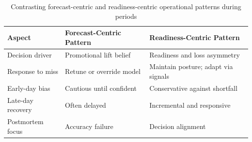
\begin{table}[htbp]
\centering
\caption{Contrasting forecast-centric and readiness-centric operational patterns during \LTO{} periods}
\label{tab:pattern-summary}
\begin{tabular}{@{}p{4cm}p{5cm}p{5cm}@{}}
\toprule
\textbf{Aspect} & \textbf{Forecast-Centric Pattern} & \textbf{Readiness-Centric Pattern} \\
\midrule
Decision driver & Promotional lift belief & Readiness and loss asymmetry \\
Response to miss & Retune or override model & Maintain posture; adapt via signals \\
Early-day bias & Cautious until confident & Conservative against shortfall \\
Late-day recovery & Often delayed & Incremental and responsive \\
Postmortem focus & Accuracy failure & Decision alignment \\
\bottomrule
\end{tabular}
\end{table}
